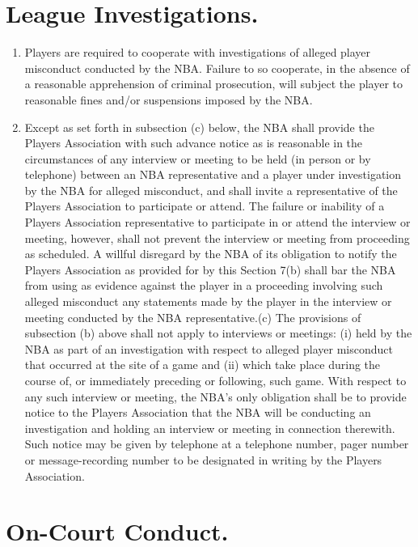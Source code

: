 \documentclass[
]{book}
\providecommand{\tightlist}{%
  \setlength{\itemsep}{0pt}\setlength{\parskip}{0pt}}
\begin{document}
\hypertarget{league-investigations.}{%
\section{League Investigations.}\label{league-investigations.}}

\begin{enumerate}
\def\labelenumi{(\alph{enumi})}
\tightlist
\item
  Players are required to cooperate with investigations of alleged player misconduct conducted by the NBA. Failure to so cooperate, in the absence of a reasonable apprehension of criminal prosecution, will subject the player to reasonable fines and/or suspensions imposed by the NBA.
\item
  Except as set forth in subsection (c) below, the NBA shall provide the Players Association with such advance notice as is reasonable in the circumstances of any interview or meeting to be held (in person or by telephone) between an NBA representative and a player under investigation by the NBA for alleged misconduct, and shall invite a representative of the Players Association to participate or attend. The failure or inability of a Players Association representative to participate in or attend the interview or meeting, however, shall not prevent the interview or meeting from proceeding as scheduled. A willful disregard by the NBA of its obligation to notify the Players Association as provided for by this Section 7(b) shall bar the NBA from using as evidence against the player in a proceeding involving such alleged misconduct any statements made by the player in the interview or meeting conducted by the NBA representative.(c) The provisions of subsection (b) above shall not apply to interviews or meetings: (i) held by the NBA as part of an investigation with respect to alleged player misconduct that occurred at the site of a game and (ii) which take place during the course of, or immediately preceding or following, such game. With respect to any such interview or meeting, the NBA's only obligation shall be to provide notice to the Players Association that the NBA will be conducting an investigation and holding an interview or meeting in connection therewith. Such notice may be given by telephone at a telephone number, pager number or message-recording number to be designated in writing by the Players Association.
\end{enumerate}

\hypertarget{on-court-conduct.}{%
\section{On-Court Conduct.}\label{on-court-conduct.}}
\end{document}
